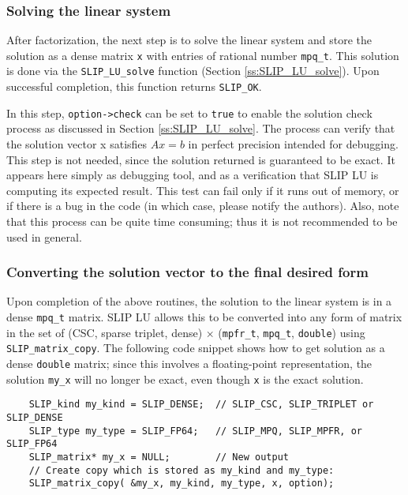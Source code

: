 \documentclass[12pt]{article}
\theoremstyle{definition}
\begin{document}
\subsubsection{Solving the linear system}

After factorization, the next step is to solve the linear system and store the
solution as a dense matrix \verb|x| with entries of rational number
\verb|mpq_t|. This solution is done via the \verb|SLIP_LU_solve|
function (Section \ref{ss:SLIP_LU_solve}). 
Upon successful completion, this function returns \verb|SLIP_OK|.

In this step, \verb|option->check| can be set to \verb|true| to enable the
solution check process as discussed in Section \ref{ss:SLIP_LU_solve}.  The
process can verify that the solution vector x satisfies $Ax=b$ in perfect
precision intended for debugging.  This step is not needed, since the solution
returned is guaranteed to be exact.   It appears here simply as debugging tool,
and as a verification that SLIP LU is computing its expected result.  This test
can fail only if it runs out of memory, or if there is a bug in the code (in
which case, please notify the authors).  Also, note that this process can be
quite time consuming; thus it is not recommended to be used in general.

\subsubsection{Converting the solution vector to the final desired form}

Upon completion of the above routines, the solution to the linear system is in
a dense \verb|mpq_t| matrix. SLIP LU allows this to be converted into any form
of matrix in the set of (CSC, sparse triplet, dense) $\times$ (\verb|mpfr_t|,
\verb|mpq_t|, \verb|double|) using \verb|SLIP_matrix_copy|. The following code
snippet shows how to get solution as a dense \verb|double| matrix; since this
involves a floating-point representation, the solution \verb|my_x| will no
longer be exact, even though \verb|x| is the exact solution.

{\small
\begin{verbatim}
    SLIP_kind my_kind = SLIP_DENSE;  // SLIP_CSC, SLIP_TRIPLET or SLIP_DENSE
    SLIP_type my_type = SLIP_FP64;   // SLIP_MPQ, SLIP_MPFR, or SLIP_FP64
    SLIP_matrix* my_x = NULL;        // New output
    // Create copy which is stored as my_kind and my_type:
    SLIP_matrix_copy( &my_x, my_kind, my_type, x, option);\end{verbatim} }
\end{document}
